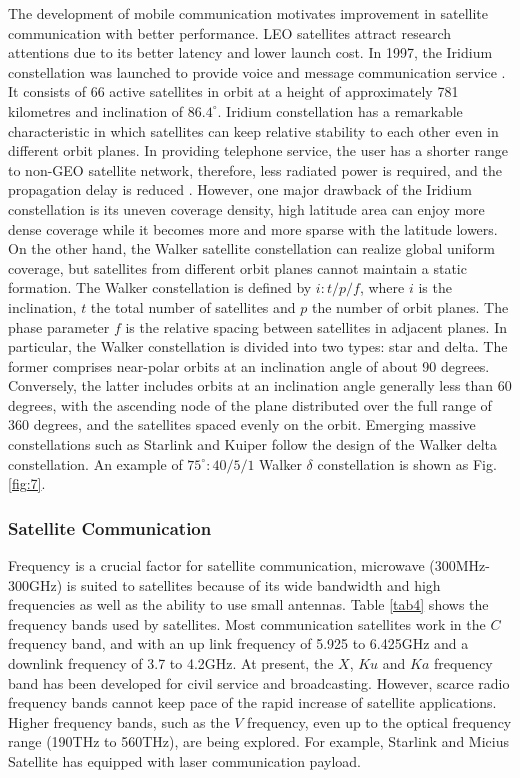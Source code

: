 \documentclass[lettersize,journal]{IEEEtran}
\begin{document}
The development of mobile communication motivates improvement in satellite communication with better performance. LEO satellites attract research attentions due to its better latency and lower launch cost. In 1997, the Iridium constellation was launched to provide voice and message communication service \cite{RN194}. It consists of 66 active satellites in orbit at a height of approximately 781 kilometres and inclination of $86.4^\circ$. Iridium constellation has a remarkable characteristic in which satellites can keep relative stability to each other even in different orbit planes. In providing telephone service, the user has a shorter range to non-GEO satellite network, therefore, less radiated power is required, and the propagation delay is reduced \cite{RN197}. However, one major drawback of the Iridium constellation is its uneven coverage density, high latitude area can enjoy more dense coverage while it becomes more and more sparse with the latitude lowers. On the other hand, the Walker satellite constellation \cite{RN195} can realize global uniform coverage, but satellites from different orbit planes cannot maintain a static formation. The Walker constellation is defined by $i:t/p/f$, where $i$ is the inclination, $t$ the total number of satellites and $p$ the number of orbit planes. The phase parameter $f$ is the relative spacing between satellites in adjacent planes. In particular, the Walker constellation is divided into two types: star and delta. The former comprises near-polar orbits at an inclination angle of about 90 degrees. Conversely, the latter includes orbits at an inclination angle generally less than 60 degrees, with the ascending node of the plane distributed over the full range of 360 degrees, and the satellites spaced evenly on the orbit. Emerging massive constellations such as Starlink and Kuiper follow the design of the Walker delta constellation. An example of $75^\circ:40/5/1$ Walker $\delta$ constellation is shown as Fig. \ref{fig:7}. 


\subsubsection*{Satellite Communication} 
Frequency is a crucial factor for satellite communication, microwave (300MHz-300GHz) is suited to satellites because of its wide bandwidth and high frequencies as well as the ability to use small antennas. Table \ref{tab4} shows the frequency bands used by satellites. Most communication satellites work in the $C$ frequency band, and with an up link frequency of 5.925 to 6.425GHz and a downlink frequency of 3.7 to 4.2GHz. At present, the $X$, $Ku$ and $Ka$ frequency band has been developed for civil service and broadcasting. However, scarce radio frequency bands cannot keep pace of the rapid increase of satellite applications. Higher frequency bands, such as the $V$ frequency, even up to the optical frequency range (190THz to 560THz), are being explored. For example, Starlink \cite{SpaceXNews} and Micius Satellite \cite{lu2022micius} has equipped with laser communication payload. 
\end{document}
